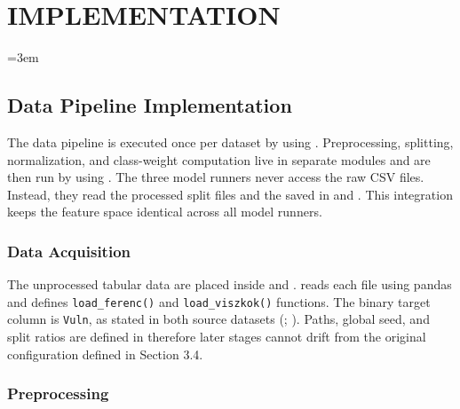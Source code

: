 \chapter{IMPLEMENTATION}
\sloppy
\emergencystretch=3em

\section{Data Pipeline Implementation}

The data pipeline is executed once per dataset by using . Preprocessing, splitting, normalization, and class-weight computation live in separate modules and are then run by using . The three model runners never access the raw CSV files. Instead, they read the processed split files and the  saved in  and . This integration keeps the feature space identical across all model runners.

\subsection{Data Acquisition}

The unprocessed tabular data are placed inside  and .  reads each file using pandas and defines \texttt{load\_ferenc()} and \texttt{load\_viszkok()} functions. The binary target column is \texttt{Vuln}, as stated in both source datasets (\citep{ferenc_challenging_2019}; \citep{viszkok_improving_2021}). Paths, global seed, and split ratios are defined in  therefore later stages cannot drift from the original configuration defined in Section 3.4.

\subsection{Preprocessing}

